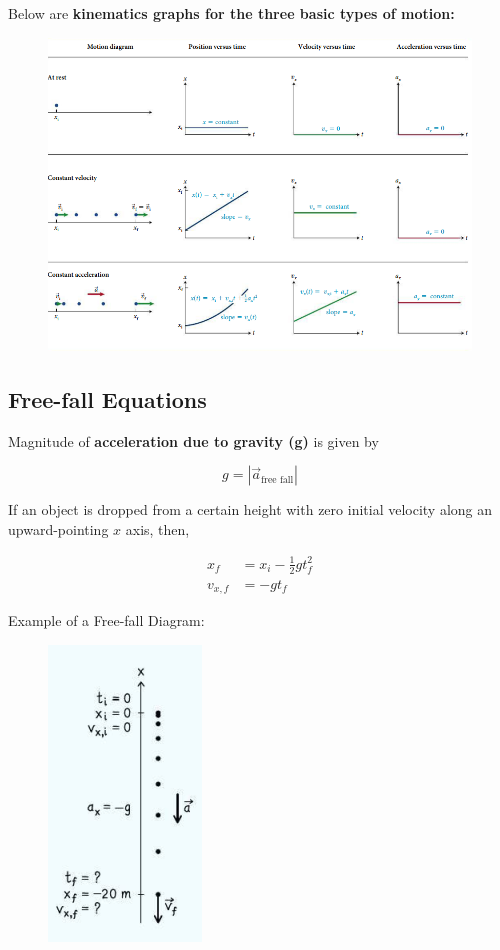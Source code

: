         Below are \textbf{kinematics graphs for the three basic types of motion:}

        \begin{figure}[hbt!]
            \centering
            \includegraphics{Resources/Motion_Diagram2}
        \end{figure}


    \pagebreak
    \subsection{Free-fall Equations}
        Magnitude of \textbf{acceleration due to gravity (g)} is given by

        \[
            g = |\overrightarrow{a}_{\text{free fall}}|
        \]

        If an object is dropped from a certain height with zero initial velocity along an upward-pointing $x$ axis, then,

        \begin{align*}
            x_f &= x_i - \frac{1}{2} gt^2_f \\
            v_{x,f} &= -gt_f
        \end{align*}

        Example of a Free-fall Diagram:

        \begin{figure}[hbt!]
            \centering
            \includegraphics[]{Resources/Free_Fall_Diagram}
        \end{figure}



